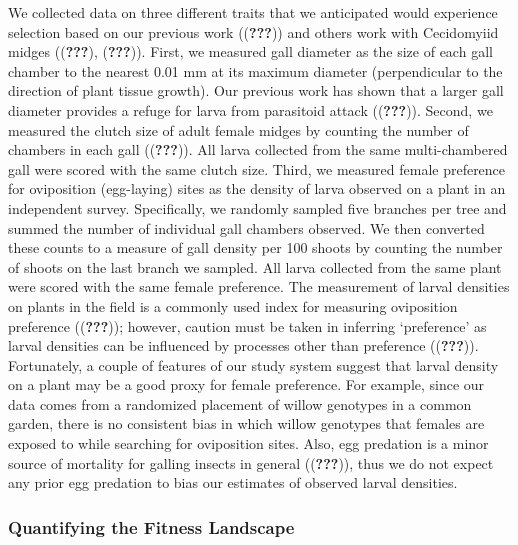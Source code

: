 \documentclass[]{elsarticle} %
\begin{document}
We collected data on three different traits that we anticipated would
experience selection based on our previous work (({\textbf{???}})) and
others work with Cecidomyiid midges (({\textbf{???}}),
({\textbf{???}})). First, we measured gall diameter as the size of each
gall chamber to the nearest 0.01 mm at its maximum diameter
(perpendicular to the direction of plant tissue growth). Our previous
work has shown that a larger gall diameter provides a refuge for larva
from parasitoid attack (({\textbf{???}})). Second, we measured the
clutch size of adult female midges by counting the number of chambers in
each gall (({\textbf{???}})). All larva collected from the same
multi-chambered gall were scored with the same clutch size. Third, we
measured female preference for oviposition (egg-laying) sites as the
density of larva observed on a plant in an independent survey.
Specifically, we randomly sampled five branches per tree and summed the
number of individual gall chambers observed. We then converted these
counts to a measure of gall density per 100 shoots by counting the
number of shoots on the last branch we sampled. All larva collected from
the same plant were scored with the same female preference. The
measurement of larval densities on plants in the field is a commonly
used index for measuring oviposition preference (({\textbf{???}}));
however, caution must be taken in inferring `preference' as larval
densities can be influenced by processes other than preference
(({\textbf{???}})). Fortunately, a couple of features of our study
system suggest that larval density on a plant may be a good proxy for
female preference. For example, since our data comes from a randomized
placement of willow genotypes in a common garden, there is no consistent
bias in which willow genotypes that females are exposed to while
searching for oviposition sites. Also, egg predation is a minor source
of mortality for galling insects in general (({\textbf{???}})), thus we
do not expect any prior egg predation to bias our estimates of observed
larval densities.

\subsubsection{Quantifying the Fitness
Landscape}\label{quantifying-the-fitness-landscape}
\end{document}
